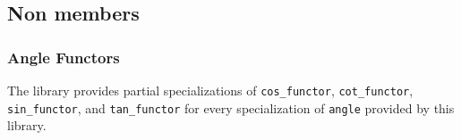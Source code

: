 \documentclass[oneside]{report}
\begin{document}
\subsection{Non members}
\subsubsection{Angle Functors}
The library provides partial specializations of \texttt{cos\_functor}, \texttt{cot\_functor},
\texttt{sin\_functor}, and \texttt{tan\_functor} for every specialization of \texttt{angle}
provided by this library.

\end{document}
